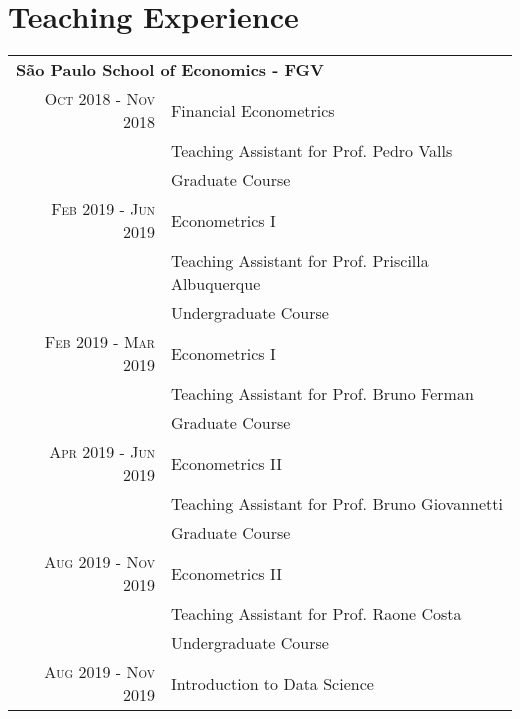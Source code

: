\documentclass[a4paper,10pt]{article}
\begin{document}
\section{Teaching Experience}
\begin{tabular}{r|p{10.5cm}}
    \multicolumn{2}{l}{\large\textbf{São Paulo School of Economics - FGV}} \\
    \textsc{Oct} 2018 - \textsc{Nov} 2018 & Financial Econometrics \\
    & \footnotesize{Teaching Assistant for Prof. Pedro Valls} \\
    & \footnotesize{Graduate Course} \\
    \textsc{Feb} 2019 - \textsc{Jun} 2019 & Econometrics I \\
    & \footnotesize{Teaching Assistant for Prof. Priscilla Albuquerque} \\
    & \footnotesize{Undergraduate Course} \\
    \textsc{Feb} 2019 - \textsc{Mar} 2019 & Econometrics I \\
    & \footnotesize{Teaching Assistant for Prof. Bruno Ferman} \\
    & \footnotesize{Graduate Course} \\
    \textsc{Apr} 2019 - \textsc{Jun} 2019 & Econometrics II \\
    & \footnotesize{Teaching Assistant for Prof. Bruno Giovannetti} \\
    & \footnotesize{Graduate Course} \\
    \textsc{Aug} 2019 - \textsc{Nov} 2019 & Econometrics II \\
    & \footnotesize{Teaching Assistant for Prof. Raone Costa} \\
    & \footnotesize{Undergraduate Course} \\
    \textsc{Aug} 2019 - \textsc{Nov} 2019 & Introduction to Data Science \\

\end{tabular}
\end{document}

